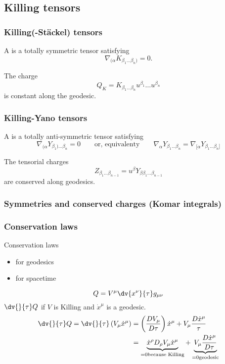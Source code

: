 \subsection{Killing tensors}

\subsubsection{Killing(-Stäckel) tensors}
A  is a totally symmetric tensor satisfying
\[ \nabla_{(\alpha}K_{\beta_1\ldots\beta_n)} = 0. \]

The charge
\[ Q_K = K_{\beta_1\ldots\beta_n}u^{\beta_1}\ldots u^{\beta_n} \]
is constant along the geodesic.

\subsubsection{Killing-Yano tensors}
A  is a totally anti-symmetric tensor satisfying
\[ \nabla_{(\alpha} Y_{\beta_1)\ldots\beta_n} = 0 \qquad \text{or, equivalenty} \qquad \nabla_\alpha Y_{\beta_1\ldots\beta_n} = \nabla_{[\alpha}Y_{\beta_1\ldots\beta_n]} \]

The tensorial charges
\[ Z_{\beta_1\ldots\beta_{n-1}} = u^\beta Y_{\beta\beta_1\ldots\beta_{n-1}} \]
are conserved along geodesics.


\subsubsection{Symmetries and conserved charges (Komar integrals)}
\subsubsection{Conservation laws}
Conservation laws
\begin{itemize}
\item for geodesics
\item for spacetime
\end{itemize}

\[ Q = V^\mu \dv{x^\nu}{\tau}g_{\mu\nu} \]
$\dv{}{\tau}Q$ if $V$ is Killing and $\dot{x}^\mu$ is a geodesic.
\begin{align*}
\dv{}{\tau}Q = \dv{}{\tau}\left(V_\mu\dot{x}^\mu\right) &= \left(\frac{DV_\mu}{D\tau}\right)\dot{x}^\mu + V_\mu \frac{D\dot{x}^\mu}{\tau} \\
&= \underbrace{\dot{x}^\rho D_\rho V_\mu \dot{x}^\mu}_{=0 \text{because Killing}} + \underbrace{V_\mu \frac{D\dot{x}^\mu}{D\tau}}_{=0 \text{geodesic}}
\end{align*}

